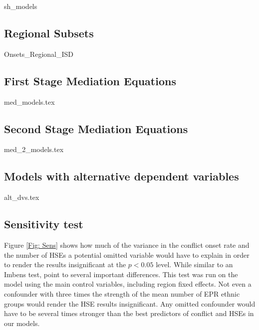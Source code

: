     {sh_models}
    
\clearpage    

\subsection{Regional Subsets}

    {Onsets_Regional_ISD}
    
\clearpage    

\subsection{First Stage Mediation Equations}

    {med_models.tex}
    
\clearpage
 
\subsection{Second Stage Mediation Equations}

\clearpage
    {med_2_models.tex}
\clearpage  
 

\subsection{Models with alternative dependent variables}



    {alt_dvs.tex}
\clearpage  


\subsection{Sensitivity test}

Figure \ref{Fig: Sens} shows how much of the variance in the conflict onset rate and the number of HSEs a potential omitted variable would have to explain in order to render the results insignificant at the $p<0.05$ level. While similar to an Imbens test, \citet{Cinelli2020} point to several important differences. This test was run on the model using the main control variables, including region fixed effects. Not even a confounder with three times the strength of the mean number of EPR ethnic groups would render the HSE results insignificant. Any omitted confounder would have to be several times stronger than the best predictors of conflict and HSEs in our models.


